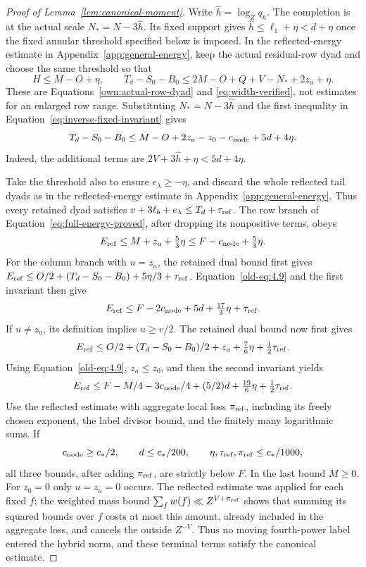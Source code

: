 \documentclass[12pt]{article}
\begin{document}
\begin{proof}[Proof of Lemma~\ref{lem:canonical-moment}]
Write \(\widehat h=\log_Zq_h\).  The completion is at the actual scale
\(N_*=N-3\widehat h\).  Its fixed support gives
\(\widehat h\le\ell_1+\eta<d+\eta\) once the fixed annular threshold
specified below is imposed.  In the reflected-energy estimate in Appendix~\ref{app:general-energy}, keep
the actual residual-row dyad and choose the same threshold so that
\begin{equation}\label{eq:inverse-terminal-width}
 H\le M-O+\eta,\qquad
 T_d-S_0-B_0\le2M-O+Q+V-N_*+2z_a+\eta.
\end{equation}
These are Equations~\eqref{own:actual-row-dyad} and
\eqref{eq:width-verified}, not estimates for an enlarged row
range.  Substituting \(N_*=N-3\widehat h\) and the first inequality in
Equation~\eqref{eq:inverse-fixed-invariant} gives
\begin{equation}\label{old-eq:4.9}
 T_d-S_0-B_0
 \le M-O+2z_a-z_0-c_{\rm node}+5d+4\eta.
\end{equation}
Indeed, the additional terms are \(2V+3\widehat h+\eta<5d+4\eta\).

Take the threshold also to ensure \(e_\lambda\ge-\eta\), and discard
the whole reflected tail dyads as in the reflected-energy estimate in Appendix~\ref{app:general-energy}.
Thus every retained dyad satisfies
\(v+3\ell_b+e_\lambda\le T_d+\tau_{\rm ref}\).  The row branch of
Equation~\eqref{eq:full-energy-proved}, after dropping its nonpositive terms, obeys
\[
 E_{\rm ref}\le M+z_a+\tfrac53\eta
       \le F-c_{\rm node}+\tfrac53\eta.
\]
For the column branch with \(u=z_a\), the retained dual bound first gives
\(E_{\rm ref}\le O/2+(T_d-S_0-B_0)+5\eta/3+\tau_{\rm ref}\).
Equation~\eqref{old-eq:4.9} and the first invariant then give
\begin{equation}\label{old-eq:4.10}
 E_{\rm ref}\le F-2c_{\rm node}+5d+\tfrac{17}{3}\eta+\tau_{\rm ref}.
\end{equation}
If \(u\ne z_a\), its definition implies \(u\ge v/2\).  The retained
dual bound now first gives
\[
 E_{\rm ref}\le O/2+(T_d-S_0-B_0)/2+z_a
                    +\tfrac76\eta+\tfrac12\tau_{\rm ref}.
\]
Using Equation~\eqref{old-eq:4.9}, \(z_a\le z_0\), and then the second
invariant yields
\begin{equation}\label{old-eq:4.11}
 E_{\rm ref}\le F-M/4-3c_{\rm node}/4+(5/2)d
                    +\tfrac{19}{6}\eta+\tfrac12\tau_{\rm ref}.
\end{equation}
Use the reflected estimate with aggregate local loss
\(\pi_{\rm ref}\), including its freely chosen exponent, the label divisor
bound, and the finitely many logarithmic sums.  If
\[
 c_{\rm node}\ge c_*/2,\qquad
 d\le c_*/200,\qquad \eta,\tau_{\rm ref},\pi_{\rm ref}\le c_*/1000,
\]
all three bounds, after adding \(\pi_{\rm ref}\), are strictly below
\(F\).  In the last bound \(M\ge0\).  For \(z_0=0\) only \(u=z_a=0\) occurs.
The reflected estimate was applied for each fixed \(f\); the weighted
mass bound \(\sum_f w(f)\ll Z^{V+\pi_{\rm ref}}\) shows that summing its
squared bounds over \(f\) costs at most this amount, already included
in the aggregate loss, and cancels the outside \(Z^{-V}\).
Thus no moving fourth-power label entered the hybrid norm, and these
terminal terms satisfy the canonical estimate.


\end{proof}
\end{document}
